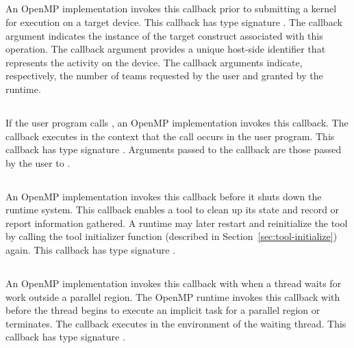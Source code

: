 \subsection{}
\label{sec:ompt_event_target_submit}
An OpenMP implementation invokes this callback prior to submitting a kernel for execution on a target device.
This callback has type signature .
The callback argument  indicates the instance of the target construct associated with this operation.
The callback argument  provides a unique host-side identifier that represents the activity on the device.
The callback arguments    indicate, respectively, the number of teams requested by the user and granted by the runtime.

\subsection{}
\label{sec:ompt_event_tcontrol}
If the user program calls , an
OpenMP implementation invokes this callback.
The callback executes in the context that the call occurs in the user program.
This callback has type signature .
Arguments passed to the callback are those passed by the user to .

\subsection{}
\label{sec:ompt_event_runtime_shutdown}
An OpenMP implementation invokes this callback before it shuts down the
 runtime system.  This callback enables a tool to clean up its
 state and record or report information gathered. A runtime may later restart and reinitialize the tool by
calling the tool initializer
function (described in Section~\ref{sec:tool-initialize}) again.
 This callback has type signature .

\subsection{}
\label{sec:ompt_event_idle}
An OpenMP implementation invokes this callback with  when a thread waits for work outside a parallel region.
  The OpenMP runtime invokes this callback with  before the thread  begins to execute an implicit task for
   a parallel region or terminates. The callback executes in the environment of the waiting thread.
  This callback has type signature .

